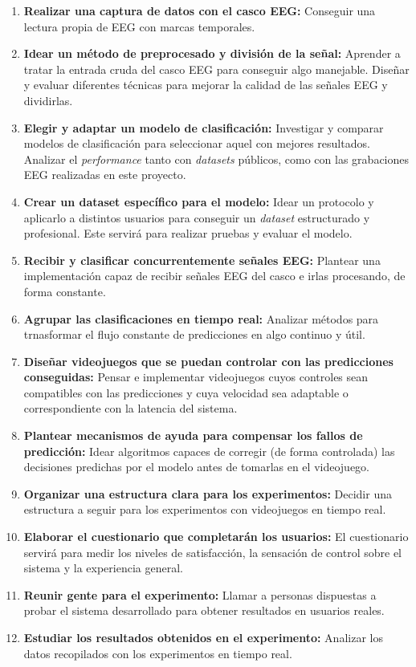 \begin{enumerate}[label=\Alph*.]
    \item \textbf{Realizar una captura de datos con el casco EEG:} Conseguir una lectura propia de EEG con marcas temporales.
    \item \textbf{Idear un método de preprocesado y división de la señal:} Aprender a tratar la entrada cruda del casco EEG para conseguir algo manejable. Diseñar y evaluar diferentes técnicas para mejorar la calidad de las señales EEG y dividirlas.
    \item \textbf{Elegir y adaptar un modelo de clasificación:} Investigar y comparar modelos de clasificación para seleccionar aquel con mejores resultados. Analizar el \textit{performance} tanto con \textit{datasets} públicos, como con las grabaciones EEG realizadas en este proyecto.
    \item \textbf{Crear un dataset específico para el modelo:} Idear un protocolo y aplicarlo a distintos usuarios para conseguir un \textit{dataset} estructurado y profesional. Este servirá para realizar pruebas y evaluar el modelo.
    \item \textbf{Recibir y clasificar concurrentemente señales EEG:} Plantear una implementación capaz de recibir señales EEG del casco e irlas procesando, de forma constante.
    \item \textbf{Agrupar las clasificaciones en tiempo real:} Analizar métodos para trnasformar el flujo constante de predicciones en algo continuo y útil.
    \item \textbf{Diseñar videojuegos que se puedan controlar con las predicciones conseguidas:} Pensar e implementar videojuegos cuyos controles sean compatibles con las predicciones y cuya velocidad sea adaptable o correspondiente con la latencia del sistema.
    \item \textbf{Plantear mecanismos de ayuda para compensar los fallos de predicción:} Idear algoritmos capaces de corregir (de forma controlada) las decisiones predichas por el modelo antes de tomarlas en el videojuego.
    \item \textbf{Organizar una estructura clara para los experimentos:} Decidir una estructura a seguir para los experimentos con videojuegos en tiempo real.
    \item \textbf{Elaborar el cuestionario que completarán los usuarios:} El cuestionario servirá para medir los niveles de satisfacción, la sensación de control sobre el sistema y la experiencia general.
    \item \textbf{Reunir gente para el experimento:} Llamar a personas dispuestas a probar el sistema desarrollado para obtener resultados en usuarios reales.
    \item \textbf{Estudiar los resultados obtenidos en el experimento:} Analizar los datos recopilados con los experimentos en tiempo real.
\end{enumerate}

